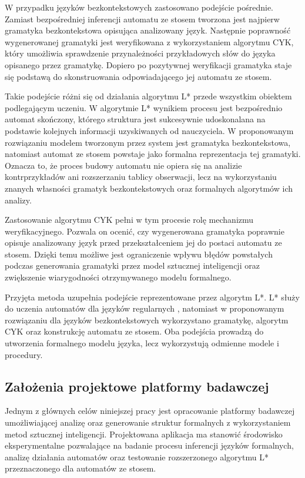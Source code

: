 \documentclass[12pt]{article}
\begin{document}
W przypadku języków bezkontekstowych zastosowano podejście pośrednie. Zamiast bezpośredniej inferencji automatu ze stosem tworzona jest najpierw gramatyka bezkontekstowa opisująca analizowany język. Następnie poprawność wygenerowanej gramatyki jest weryfikowana z wykorzystaniem algorytmu CYK, który umożliwia sprawdzenie przynależności przykładowych słów do języka opisanego przez gramatykę. Dopiero po pozytywnej weryfikacji gramatyka staje się podstawą do skonstruowania odpowiadającego jej automatu ze stosem.

Takie podejście różni się od działania algorytmu L* przede wszystkim obiektem podlegającym uczeniu. W algorytmie L* wynikiem procesu jest bezpośrednio automat skończony, którego struktura jest sukcesywnie udoskonalana na podstawie kolejnych informacji uzyskiwanych od nauczyciela. W proponowanym rozwiązaniu modelem tworzonym przez system jest gramatyka bezkontekstowa, natomiast automat ze stosem powstaje jako formalna reprezentacja tej gramatyki. Oznacza to, że proces budowy automatu nie opiera się na analizie kontrprzykładów ani rozszerzaniu tablicy obserwacji, lecz na wykorzystaniu znanych własności gramatyk bezkontekstowych oraz formalnych algorytmów ich analizy.

Zastosowanie algorytmu CYK pełni w tym procesie rolę mechanizmu weryfikacyjnego. Pozwala on ocenić, czy wygenerowana gramatyka poprawnie opisuje analizowany język przed przekształceniem jej do postaci automatu ze stosem. Dzięki temu możliwe jest ograniczenie wpływu błędów powstałych podczas generowania gramatyki przez model sztucznej inteligencji oraz zwiększenie wiarygodności otrzymywanego modelu formalnego.

Przyjęta metoda uzupełnia podejście reprezentowane przez algorytm L*. L* służy do uczenia automatów dla języków regularnych \cite{angluin1987}, natomiast w proponowanym rozwiązaniu dla języków bezkontekstowych wykorzystano gramatykę, algorytm CYK oraz konstrukcję automatu ze stosem. Oba podejścia prowadzą do utworzenia formalnego modelu języka, lecz wykorzystują odmienne modele i procedury.


\subsection{Założenia projektowe platformy badawczej}

Jednym z głównych celów niniejszej pracy jest opracowanie platformy badawczej umożliwiającej analizę oraz generowanie struktur formalnych z wykorzystaniem metod sztucznej inteligencji. Projektowana aplikacja ma stanowić środowisko eksperymentalne pozwalające na badanie procesu inferencji języków formalnych, analizę działania automatów oraz testowanie rozszerzonego algorytmu L* przeznaczonego dla automatów ze stosem.
\end{document}
